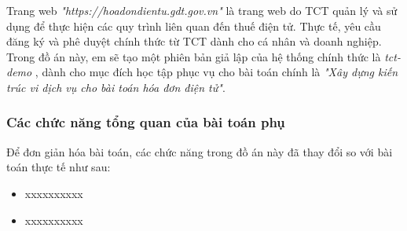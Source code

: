 Trang web \emph{"https://hoadondientu.gdt.gov.vn"} là trang web do TCT quản lý và sử dụng để thực hiện các quy trình liên quan đến thuế điện tử. Thực tế, yêu cầu đăng ký và phê duyệt chính thức từ TCT dành cho cá nhân và doanh nghiệp. Trong đồ án này, em sẽ tạo một phiên bản giả lập của hệ thống chính thức là \emph{tct-demo} , dành cho mục đích học tập phục vụ cho bài toán chính là \emph{"Xây dựng kiến trúc vi dịch vụ cho bài toán hóa đơn điện tử"}.

\subsubsection{Các chức năng tổng quan của bài toán phụ}

Để đơn giản hóa bài toán, các chức năng trong đồ án này đã thay đổi so với bài toán thực tế như sau:

\begin{itemize}

\item xxxxxxxxxx

\item xxxxxxxxxx

\end{itemize}












% 





